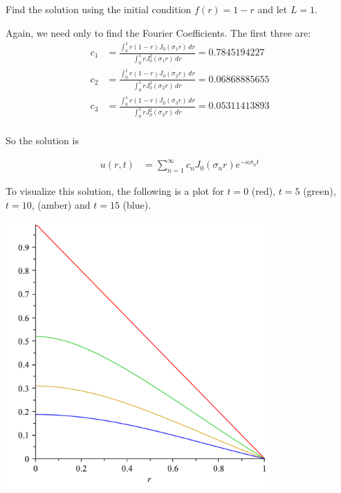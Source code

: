 \begin{example}
Find the solution using the initial condition $f(r)=1-r$ and let $L=1$. 

\solution

Again, we need only to find the Fourier Coefficients.  The first three are:
%
\begin{align*}
c_1 & = \frac{\int_0^1  r(1-r) J_0(\sigma_1 r) \, dr}{\int_0^1 r J_0^2(\sigma_1 r) \, dr}  = 0.7845194227 \\
c_2 & = \frac{\int_0^1  r(1-r) J_0(\sigma_2 r) \, dr}{\int_0^1 r J_0^2(\sigma_2 r) \, dr}  = 0.06868885655\\
c_3 & = \frac{\int_0^1  r(1-r) J_0(\sigma_3 r) \, dr}{\int_0^1 r J_0^2(\sigma_3 r) \, dr}  = 0.05311413893\\
\end{align*}

So the solution is 

\begin{align*}
u(r,t) & = \sum_{n=1}^{\infty}c_n J_0(\sigma_n r) e^{-\kappa \sigma_n t} 
\end{align*}

To visualize this solution, the following is a plot for $t=0$ (red), $t=5$ (green), $t=10$, (amber) and $t=15$ (blue).  

\begin{center}
\includegraphics[width=4in]{heat-eqn-radially-sym-plot.pdf}
\end{center}

\end{example}






